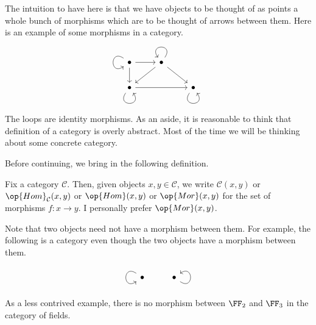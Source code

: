 The intuition to have here is that we have objects to be thought of as points a whole bunch of morphisms which are to be thought of arrows between them. Here is an example of some morphisms in a category.
\[\begin{tikzcd}
	\bullet \arrow[d] \arrow[r] \arrow[loop, distance=2em, in=215, out=145] & \bullet \arrow[ld] \arrow[rd] \arrow[loop, distance=2em, in=125, out=55] &                                                     \\
	\bullet \arrow[rr] \arrow[loop, distance=2em, in=305, out=235]          &                                                                          & \bullet \arrow[loop, distance=2em, in=305, out=235]
\end{tikzcd}\]
The loops are identity morphisms. As an aside, it is reasonable to think that definition of a category is overly abstract. Most of the time we will be thinking about some concrete category.

Before continuing, we bring in the following definition.
\begin{definition}
	Fix a category $\mathcal C$. Then, given objects $x,y\in\mathcal C$, we write $\mathcal C(x,y)$ or $\op{Hom}_\mathcal C(x,y)$ or $\op{Hom}(x,y)$ or $\op{Mor}(x,y)$ for the set of morphisms $f:x\to y$. I personally prefer $\op{Mor}(x,y)$.
\end{definition}
\noindent Note that two objects need not have a morphism between them. For example, the following is a category even though the two objects have a morphism between them.
\[\begin{tikzcd}
	\bullet \arrow[loop, distance=2em, in=215, out=145] & \bullet \arrow[loop, distance=2em, in=35, out=325]
\end{tikzcd}\]
As a less contrived example, there is no morphism between $\FF_2$ and $\FF_3$ in the category of fields.

